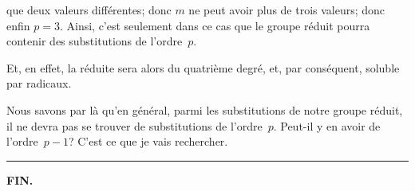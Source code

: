 que deux valeurs différentes; donc $m$ ne peut avoir plus de trois
valeurs; donc enfin $p = 3$. Ainsi, c'est seulement dans ce cas
que le groupe réduit pourra contenir des substitutions de l'ordre~$p$.

Et, en effet, la réduite sera alors du quatrième degré, et, par
conséquent, soluble par radicaux.

Nous savons par là qu'en général, parmi les substitutions de notre
groupe réduit, il ne devra pas se trouver de substitutions de
l'ordre~$p$. Peut-il y en avoir de l'ordre~$p - 1$? C'est ce que je vais
rechercher.


\par\vspace{1.0em}\noindent\dotfill\par
\vspace{0.4em}\hrule\vspace{2.6em}
\begin{center}\bfseries FIN.\end{center}
